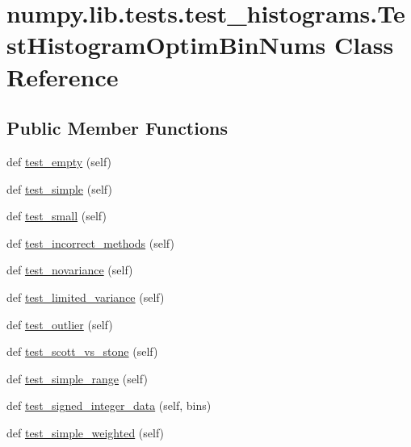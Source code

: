 \hypertarget{classnumpy_1_1lib_1_1tests_1_1test__histograms_1_1TestHistogramOptimBinNums}{}\section{numpy.\+lib.\+tests.\+test\+\_\+histograms.\+Test\+Histogram\+Optim\+Bin\+Nums Class Reference}
\label{classnumpy_1_1lib_1_1tests_1_1test__histograms_1_1TestHistogramOptimBinNums}
\subsection*{Public Member Functions}
\begin{DoxyCompactItemize}
\item 
def \hyperlink{classnumpy_1_1lib_1_1tests_1_1test__histograms_1_1TestHistogramOptimBinNums_a3130dbaa8467dde49d7275e6f034dfcb}{test\+\_\+empty} (self)
\item 
def \hyperlink{classnumpy_1_1lib_1_1tests_1_1test__histograms_1_1TestHistogramOptimBinNums_aaef2ff8aa2cb240a71c17952f71613fb}{test\+\_\+simple} (self)
\item 
def \hyperlink{classnumpy_1_1lib_1_1tests_1_1test__histograms_1_1TestHistogramOptimBinNums_a9d8ee49f5c00c8e7cb28374a94b4515d}{test\+\_\+small} (self)
\item 
def \hyperlink{classnumpy_1_1lib_1_1tests_1_1test__histograms_1_1TestHistogramOptimBinNums_a893d7b3d4310963efffd0f5e6576bbf6}{test\+\_\+incorrect\+\_\+methods} (self)
\item 
def \hyperlink{classnumpy_1_1lib_1_1tests_1_1test__histograms_1_1TestHistogramOptimBinNums_a12eb9ed50e28a8f03d08bb847cf5eff6}{test\+\_\+novariance} (self)
\item 
def \hyperlink{classnumpy_1_1lib_1_1tests_1_1test__histograms_1_1TestHistogramOptimBinNums_a67c5568db8736fe196fc1bd4f8b6c729}{test\+\_\+limited\+\_\+variance} (self)
\item 
def \hyperlink{classnumpy_1_1lib_1_1tests_1_1test__histograms_1_1TestHistogramOptimBinNums_a556728119a01e70af38b7b7b2028c760}{test\+\_\+outlier} (self)
\item 
def \hyperlink{classnumpy_1_1lib_1_1tests_1_1test__histograms_1_1TestHistogramOptimBinNums_a5f2162542311066bdbb9801858c9264c}{test\+\_\+scott\+\_\+vs\+\_\+stone} (self)
\item 
def \hyperlink{classnumpy_1_1lib_1_1tests_1_1test__histograms_1_1TestHistogramOptimBinNums_acb0d8acc4f3499ff701e66b8c28defaf}{test\+\_\+simple\+\_\+range} (self)
\item 
def \hyperlink{classnumpy_1_1lib_1_1tests_1_1test__histograms_1_1TestHistogramOptimBinNums_a8773e628aeca0ce3f014ae22008b9131}{test\+\_\+signed\+\_\+integer\+\_\+data} (self, bins)
\item 
def \hyperlink{classnumpy_1_1lib_1_1tests_1_1test__histograms_1_1TestHistogramOptimBinNums_aa1d2e7405da02d111be8dda827efc15c}{test\+\_\+simple\+\_\+weighted} (self)
\end{DoxyCompactItemize}


